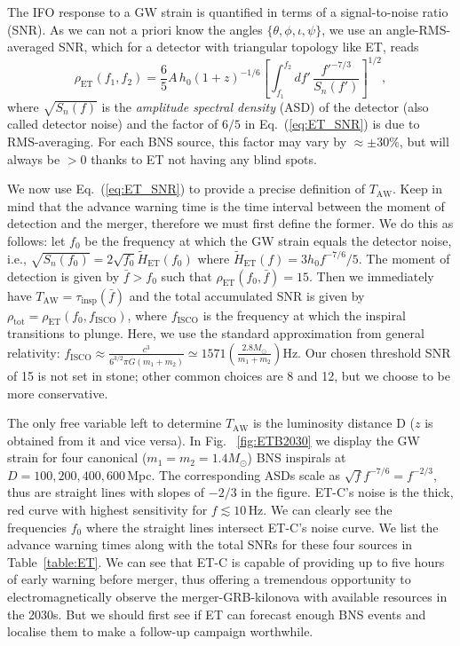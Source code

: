 \documentclass{aa}
\newcommand{\be}{\begin{equation}}
\newcommand{\ee}{\end{equation}}
\newcommand{\f}{\frac}
\begin{document}
The IFO response to a GW strain is quantified in terms of a signal-to-noise ratio (SNR).
As we can not a priori know the angles $\{\theta,\phi,\iota,\psi\}$, we use an angle-RMS-averaged SNR, 
which for a detector with triangular topology like ET, reads
%
\be
\rho_{\text{ET}}(f_1,f_2) = \f{6}{5}A\, h_0  (1+z)^{-1/6} \left[\int_{f_1}^{f_2} d f'\, \f{f'^{-7/3}}{S_n(f')}\right]^{1/2} \label{eq:ET_SNR},
\ee
%
where %
$\sqrt{S_n(f)}$ is the {\it amplitude spectral density} (ASD) of the detector (also called detector noise) and
the factor of $6/5$ in Eq.~(\ref{eq:ET_SNR})
is due to RMS-averaging. %
For each BNS source, this factor may vary by
$\approx \pm 30\%$, but will always be $>0$ thanks to ET not having any blind spots.

We now use Eq.~(\ref{eq:ET_SNR}) to provide a precise definition of $T_\text{AW}$. Keep in mind
that the advance warning time is the time interval between the moment of detection and the merger,
therefore we must first define the former.
We do this as follows: let $f_0$ be the frequency
at which the GW strain equals the detector noise, i.e., $\sqrt{S_n(f_0)}=2\sqrt{f_0} \tilde{H}_\text{ET}(f_0)$ where $\tilde{H}_\text{ET}(f)=3 h_0 f^{-7/6}/5$.
The moment of detection is given by 
$\bar{f}>f_0$ such that $\rho_\text{ET}(f_0,\bar{f})=15$. Then we immediately have
$T_\text{AW} = \tau_\text{insp}(\bar{f})$
and the total accumulated SNR is given by
$\rho_\text{tot}=\rho_\text{ET}(f_0, f_\text{ISCO})$, where
$f_\text{ISCO}$ is the frequency at which the inspiral transitions to plunge. Here, we use the standard approximation from general relativity: $f_\text{ISCO} \approx \tfrac{c^3}{6^{3/2}\pi G (m_1+m_2)} \simeq 1571 \left(\tfrac{2.8M_\odot}{m_1+m_2}\right)\text{Hz}$. Our chosen threshold SNR of 15 is not set in stone;
other common choices are 8 and 12, but we choose to be more conservative.

The only free variable left to determine
$T_\text{AW}$ is the luminosity distance D ($z$ is obtained from it and vice versa). In Fig.~
\ref{fig:ETB2030} we display the GW strain for four canonical ($m_1=m_2=1.4 M_\odot$) BNS inspirals at $D=100,200, 400, 600\,$Mpc. 
The corresponding ASDs scale as $ \sqrt{f} f^{-7/6} = f^{-2/3}$,
thus are straight lines with slopes of $-2/3$ in the figure.
ET-C's
noise is the thick, red curve with highest sensitivity for $f\lesssim 10\,$Hz. We can clearly see the frequencies $f_0$ where the
straight lines intersect ET-C's noise curve.
We list the advance warning times along with the total SNRs for these four sources in  Table~\ref{table:ET}.
We can see that ET-C is capable of providing up to five hours of early warning before merger,
thus offering a tremendous opportunity to electromagnetically observe the merger-GRB-kilonova with available
resources in the 2030s.
But we should first see if ET can forecast enough BNS events and localise them to make a follow-up campaign worthwhile.
\end{document}
